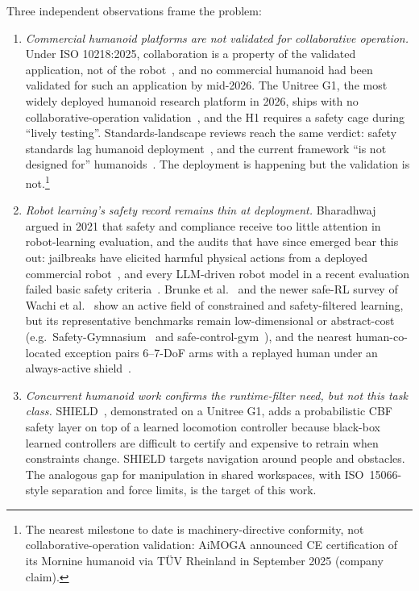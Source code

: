 \documentclass[11pt,a4paper]{report}
\newcommand{\iso}{ISO~15066}
\begin{document}
Three independent observations frame the problem:

\begin{enumerate}[topsep=2pt,itemsep=2pt]
\item \emph{Commercial humanoid platforms are not validated for
  collaborative operation.} Under ISO 10218:2025, collaboration is a
  property of the validated application, not of the
  robot~\cite{hartmann2026iso}, and no commercial humanoid had been
  validated for such an application by mid-2026. The Unitree G1, the
  most widely deployed humanoid research platform in 2026, ships
  with no collaborative-operation validation~\cite{unitree_g1}, and
  the H1 requires a safety cage during ``lively testing''.
  Standards-landscape reviews reach the same verdict: safety
  standards lag humanoid deployment~\cite{koczi2025humanoidsafety},
  and the current framework ``is not designed for''
  humanoids~\cite{ieee2025pathway}. The deployment is happening but
  the validation is not.\footnote{The nearest milestone to date is
  machinery-directive conformity, not collaborative-operation
  validation: AiMOGA announced CE certification of its Mornine
  humanoid via T\"UV Rheinland in September 2025 (company claim).}
\item \emph{Robot learning's safety record remains thin at deployment.}
  Bharadhwaj~\cite{auditing2021} argued in 2021 that safety and
  compliance receive too little attention in robot-learning
  evaluation, and the audits that have since emerged bear this out:
  jailbreaks have elicited harmful physical actions from a deployed
  commercial robot~\cite{robey2025jailbreaking}, and every
  LLM-driven robot model in a recent evaluation failed basic safety
  criteria~\cite{hundt2025llmrobots}. Brunke et
  al.~\cite{brunke2022safelearning} and the newer safe-RL survey of
  Wachi et al.~\cite{wachi2024constraint} show an active field of
  constrained and safety-filtered learning, but its representative
  benchmarks remain low-dimensional or abstract-cost
  (e.g.\ Safety-Gymnasium~\cite{ji2023safetygymnasium} and
  safe-control-gym~\cite{yuan2022safecontrolgym}), and the nearest
  human-co-located exception pairs 6--7-DoF arms with a replayed
  human under an always-active shield~\cite{thumm2024humanrobotgym}.
\item \emph{Concurrent humanoid work confirms the runtime-filter need,
  but not this task class.} SHIELD~\cite{shield2025}, demonstrated on
  a Unitree G1, adds a probabilistic CBF safety layer on top of a
  learned locomotion controller because black-box learned controllers
  are difficult to certify and expensive to retrain when constraints
  change. SHIELD targets navigation around people and obstacles. The
  analogous gap for manipulation in shared workspaces, with
  \iso{}-style separation and force limits, is the target of this work.
\end{enumerate}
\end{document}
